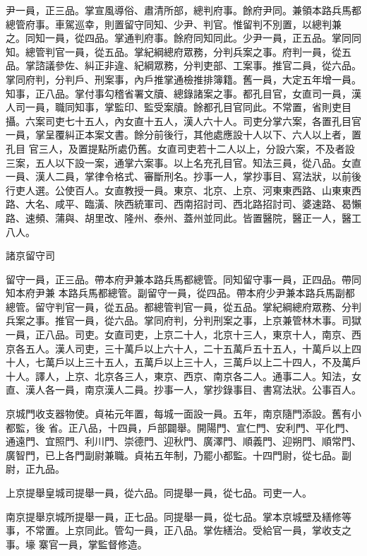 \begin{pinyinscope}
 尹一員，正三品。掌宣風導俗、肅清所部，總判府事。餘府尹同。兼領本路兵馬都總管府事。車駕巡幸，則置留守同知、少尹、判官。惟留判不別置，以總判兼
 之。同知一員，從四品。掌通判府事。餘府同知同此。少尹一員，正五品。掌同同知。總管判官一員，從五品。掌紀綱總府眾務，分判兵案之事。府判一員，從五品。掌諮議參佐、糾正非違、紀綱眾務，分判吏部、工案事。推官二員，從六品。掌同府判，分判戶、刑案事，內戶推掌通檢推排簿籍。舊一員，大定五年增一員。知事，正八品。掌付事勾稽省署文牘、總錄諸案之事。都孔目官，女直司一員，漢人司一員，職同知事，掌監印、監受案牘。餘都孔目官同此。不常置，省則吏目攝。六案司吏七十五人，內女直十五人，漢人六十人。司吏分掌六案，各置孔目官一員，掌呈覆糾正本案文書。餘分前後行，其他處應設十人以下、六人以上者，置孔目
 官三人，及置提點所處仍舊。女直司吏若十二人以上，分設六案，不及者設三案，五人以下設一案，通掌六案事。以上名充孔目官。知法三員，從八品。女直一員、漢人二員，掌律令格式、審斷刑名。抄事一人，掌抄事目、寫法狀，以前後行吏人選。公使百人。女直教授一員。東京、北京、上京、河東東西路、山東東西路、大名、咸平、臨潢、陜西統軍司、西南招討司、西北路招討司、婆速路、曷懶路、速頻、蒲與、胡里改、隆州、泰州、蓋州並同此。皆置醫院，醫正一人，醫工八人。



 諸京留守司



 留守一員，正三品。帶本府尹兼本路兵馬都總管。同知留守事一員，正四品。帶同知本府尹兼
 本路兵馬都總管。副留守一員，從四品。帶本府少尹兼本路兵馬副都總管。留守判官一員，從五品。都總管判官一員，從五品。掌紀綱總府眾務、分判兵案之事。推官一員，從六品。掌同府判，分判刑案之事，上京兼管林木事。司獄一員，正八品。司吏。女直司吏，上京二十人，北京十三人，東京十人，南京、西京各五人。漢人司吏，三十萬戶以上六十人，二十五萬戶五十五人，十萬戶以上四十人，七萬戶以上三十五人，五萬戶以上三十人，三萬戶以上二十四人，不及萬戶十人。譯人，上京、北京各三人，東京、西京、南京各二人。通事二人。知法，女直、漢人各一員，南京漢人二員。抄事一人，掌抄錄事目、書寫法狀。公事百人。



 京城門收支器物使。貞祐元年置，每城一面設一員。五年，南京隨門添設。舊有小都監，後
 省。正八品，十四員，戶部闢舉。開陽門、宣仁門、安利門、平化門、通遠門、宜照門、利川門、崇德門、迎秋門、廣澤門、順義門、迎朔門、順常門、廣智門，已上各門副尉兼職。貞祐五年制，乃罷小都監。十四門尉，從七品。副尉，正九品。



 上京提舉皇城司提舉一員，從六品。同提舉一員，從七品。司吏一人。



 南京提舉京城所提舉一員，正七品。同提舉一員，從七品。掌本京城壁及繕修等事，不常置。上京同此。管勾一員，正八品。掌佐繕治。受給官一員，掌收支之事。壕
 寨官一員，掌監督修造。




\end{pinyinscope}
